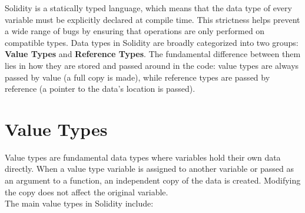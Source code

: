 \documentclass{scrbook}
\begin{document}
Solidity is a statically typed language, which means that the data type of every variable must be explicitly declared at compile time. This strictness helps prevent a wide range of bugs by ensuring that operations are only performed on compatible types. Data types in Solidity are broadly categorized into two groups: \textbf{Value Types} and \textbf{Reference Types}. The fundamental difference between them lies in how they are stored and passed around in the code: value types are always passed by value (a full copy is made), while reference types are passed by reference (a pointer to the data's location is passed).

\section{Value Types}

Value types are fundamental data types where variables hold their own data directly. When a value type variable is assigned to another variable or passed as an argument to a function, an independent copy of the data is created. Modifying the copy does not affect the original variable.\\

The main value types in Solidity include:
\end{document}

